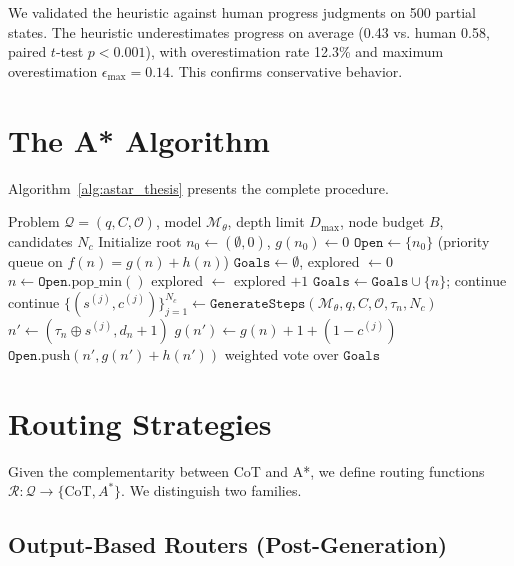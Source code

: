 We validated the heuristic against human progress judgments on 500 partial states. The heuristic underestimates progress on average (0.43 vs. human 0.58, paired $t$-test $p < 0.001$), with overestimation rate 12.3\% and maximum overestimation $\epsilon_{\max} = 0.14$. This confirms conservative behavior.

\section{The A* Algorithm}

Algorithm~\ref{alg:astar_thesis} presents the complete procedure.

\begin{algorithm}[ht]
\caption{Budgeted A* Search over Reasoning Traces}
\label{alg:astar_thesis}
\begin{algorithmic}[1]
\REQUIRE Problem $\mathcal{Q} = (q, C, \mathcal{O})$, model $\mathcal{M}_\theta$, depth limit $D_{\max}$, node budget $B$, candidates $N_c$
\STATE Initialize root $n_0 \gets (\emptyset, 0)$, $g(n_0) \gets 0$
\STATE $\texttt{Open} \gets \{n_0\}$ (priority queue on $f(n) = g(n) + h(n)$)
\STATE $\texttt{Goals} \gets \emptyset$, explored $\gets 0$
    \STATE $n \gets \texttt{Open}.\text{pop\_min}()$
    \STATE explored $\gets$ explored $+ 1$
        \STATE $\texttt{Goals} \gets \texttt{Goals} \cup \{n\}$; continue
    \ENDIF
        \STATE continue
    \ENDIF
    \STATE $\{(s^{(j)}, c^{(j)})\}_{j=1}^{N_c} \gets \texttt{GenerateSteps}(\mathcal{M}_\theta, q, C, \mathcal{O}, \tau_n, N_c)$
        \STATE $n' \gets (\tau_n \oplus s^{(j)}, d_n + 1)$
        \STATE $g(n') \gets g(n) + 1 + (1 - c^{(j)})$
        \STATE $\texttt{Open}.\text{push}(n', g(n') + h(n'))$
    \ENDFOR
\ENDWHILE
\RETURN weighted vote over $\texttt{Goals}$
\end{algorithmic}
\end{algorithm}

\section{Routing Strategies}

Given the complementarity between CoT and A*, we define routing functions $\mathcal{R}: \mathcal{Q} \to \{\text{CoT}, A^*\}$. We distinguish two families.

\subsection{Output-Based Routers (Post-Generation)}

